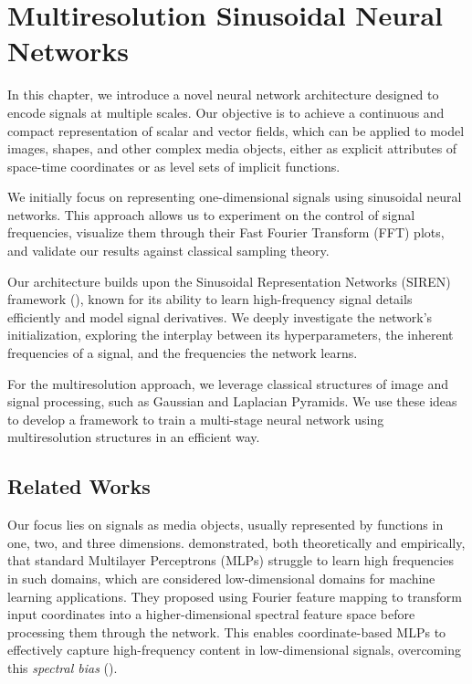 \chapter{Multiresolution Sinusoidal Neural Networks}

In this chapter, we introduce a novel neural network architecture designed to encode signals at multiple scales. Our objective is to achieve a continuous and compact representation of scalar and vector fields, which can be applied to model images, shapes, and other complex media objects, either as explicit attributes of space-time coordinates or as level sets of implicit functions.

We initially focus on representing one-dimensional signals using sinusoidal neural networks. This approach allows us to experiment on the control of signal frequencies, visualize them through their Fast Fourier Transform (FFT) plots, and validate our results against classical sampling theory.

Our architecture builds upon the Sinusoidal Representation Networks (SIREN) framework (\cite{sitzmann2019siren}), known for its ability to learn high-frequency signal details efficiently and model signal derivatives. We deeply investigate the network's initialization, exploring the interplay between its hyperparameters, the inherent frequencies of a signal, and the frequencies the network learns.

For the multiresolution approach, we leverage classical structures of image and signal processing, such as Gaussian and Laplacian Pyramids. We use these ideas to develop a framework to train a multi-stage neural network using multiresolution structures in an efficient way. 


\section{Related Works}

Our focus lies on signals as media objects, usually represented by functions in one, two, and three dimensions. \cite{tancik2020fourfeat} demonstrated, both theoretically and empirically, that standard Multilayer Perceptrons (MLPs) struggle to learn high frequencies in such domains, which are considered low-dimensional domains for machine learning applications. They proposed using Fourier feature mapping to transform input coordinates into a higher-dimensional spectral feature space before processing them through the network. This enables coordinate-based MLPs to effectively capture high-frequency content in low-dimensional signals, overcoming this \textit{spectral bias} (\cite{rahaman2018spectral}).

